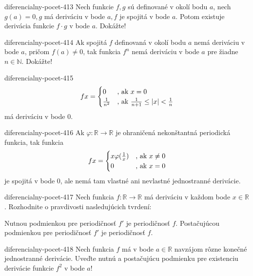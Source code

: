 \begin{defproblem}{diferencialny-pocet-413}
Nech funkcie $f,g$ sú definované v okolí bodu $a$, nech $g(a)=0,g$ má deriváciu
v bode $a,f$ je spojitá v bode $a$. Potom existuje derivácia funkcie $f\cdot g$
v bode $a$. Dokážte!
\end{defproblem}

\begin{defproblem}{diferencialny-pocet-414}
Ak spojitá $f$ definovaná v okolí bodu $a$ nemá deriváciu v bode $a$, pričom
$f(a)\neq 0$, tak funkcia $f^{n}$ nemá deriváciu v bode $a$ pre žiadne
$n\in\mathbb{N}$. Dokážte!
\end{defproblem}

\begin{defproblem}{diferencialny-pocet-415}
\[
  f{x}= \begin{cases}
    0 & $, ak $ x = 0 \\
    \frac{1}{n^2} &  $, ak $ \frac{1}{n+1}\leq |x|<\frac{1}{n}
  \end{cases}
\]
má deriváciu v bode $0$.
\end{defproblem}

\begin{defproblem}{diferencialny-pocet-416}
Ak $\varphi:\mathbb{R}\rightarrow\mathbb{R}$ je ohraničená nekonštantná
periodická funkcia, tak funkcia
\[
  f{x}=
  \begin{cases}
    x\varphi (\frac{1}{x}) & $, ak $ x \neq 0 \\
    0 &  $, ak $ x=0
  \end{cases}
\]
je spojitá v bode $0$, ale nemá tam vlastné ani nevlastné jednostranné
derivácie.
\end{defproblem}

\begin{defproblem}{diferencialny-pocet-417}
Nech funkcia $f:\mathbb{R}\rightarrow\mathbb{R}$ má deriváciu v každom bode
$x\in\mathbb{R}$. Rozhodnite o pravdivosti nasledujúcich tvrdení:
\begin{tasks}
\task Nutnou podmienkou pre periodičnosť $f'$ je periodičnosť $f$.
\task Postačujúcou podmienkou pre periodičnosť $f'$ je periodičnosť $f$.
\end{tasks}
\end{defproblem}

\begin{defproblem}{diferencialny-pocet-418}
Nech funkcia $f$ má v bode $a\in\mathbb{R}$ navzájom rôzne konečné jednostranné
derivácie. Uveďte nutnú a postačujúcu podmienku pre existenciu derivácie funkcie
$f^2$ v bode $a$!
\end{defproblem}

